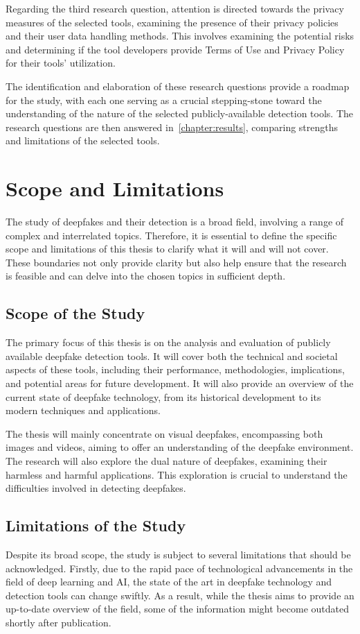 Regarding the third research question, attention is directed towards the privacy measures of the
selected tools, examining the presence of their privacy policies and their user data handling
methods. This involves examining the potential risks and determining if the tool developers
provide Terms of Use and Privacy Policy for their tools' utilization.

The identification and elaboration of these research questions provide a roadmap for the study,
with each one serving as a crucial stepping-stone toward the understanding of the nature of
the selected publicly-available detection tools. The research questions are then answered in~\autoref{chapter:results},
comparing strengths and limitations of the selected tools.

\section{Scope and Limitations}\label{chapter:scope}
The study of deepfakes and their detection is a broad field, involving a range of complex and
interrelated topics. Therefore, it is essential to define the specific scope and
limitations of this thesis to clarify what it will and will not cover. These boundaries
not only provide clarity but also help ensure that the research is feasible and can delve
into the chosen topics in sufficient depth.

\subsection{Scope of the Study}
The primary focus of this thesis is on the analysis and evaluation of publicly available
deepfake detection tools. It will cover both the technical and societal aspects of these
tools, including their performance, methodologies, implications, and potential areas for
future development. It will also provide an overview of the current state of deepfake
technology, from its historical development to its modern techniques and applications.

The thesis will mainly concentrate on visual deepfakes, encompassing both images and
videos, aiming to offer an understanding of the deepfake environment. The
research will also explore the dual nature of deepfakes, examining their harmless
and harmful applications. This exploration is crucial to understand the
difficulties involved in detecting deepfakes.

\subsection{Limitations of the Study}
Despite its broad scope, the study is subject to several limitations that should be
acknowledged. Firstly, due to the rapid pace of technological advancements in the field
of deep learning and \ac{AI}, the state of the art in deepfake technology and detection tools
can change swiftly. As a result, while the thesis aims to provide an up-to-date overview
of the field, some of the information might become outdated shortly after publication.

